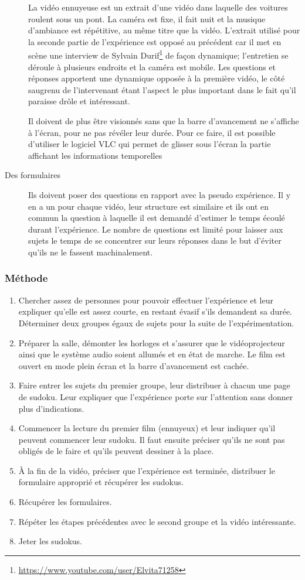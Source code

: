 \documentclass[12pt,fleqn,oneside,french,openany]{book} %
\begin{document}
\begin{description}
	La vidéo ennuyeuse est un extrait d'une vidéo dans laquelle des voitures roulent sous un pont. La caméra est fixe, il fait nuit et la musique d'ambiance est répétitive, au même titre que la vidéo. L'extrait utilisé pour la seconde partie de l'expérience est opposé au précédent car il met en scène une interview de Sylvain Durif\footnote{\url{https://www.youtube.com/user/Elvita71258}} de façon dynamique; l'entretien se déroule à plusieurs endroits et la caméra est mobile. Les questions et réponses apportent une dynamique opposée à la première vidéo, le côté saugrenu de l'intervenant étant l'aspect le plus important dans le fait qu'il paraisse drôle et intéressant. 

	Il doivent de plus être visionnés sans que la barre d'avancement ne s'affiche à l'écran, pour ne pas révéler leur durée. Pour ce faire, il est possible d'utiliser le logiciel VLC qui permet de glisser sous l'écran la partie affichant les informations temporelles  \item[Des formulaires] Ils doivent poser des questions en rapport avec la pseudo expérience. Il y en a un pour chaque vidéo, leur structure est similaire et ils ont en commun la question à laquelle il est demandé d'estimer le temps écoulé durant l'expérience. Le nombre de questions est limité pour laisser aux sujets le temps de se concentrer sur leurs réponses dans le but d'éviter qu'ils ne le fassent machinalement.
\end{description}

\subsubsection{Méthode} \label{sssec:methode1}
\begin{enumerate}
	\item Chercher assez de personnes pour pouvoir effectuer l'expérience et leur expliquer qu'elle est assez courte, en restant évasif s'ils demandent sa durée. Déterminer deux groupes égaux de sujets pour la suite de l'expérimentation.
	\item Préparer la salle, démonter les horloges et s'assurer que le vidéoprojecteur ainsi que le système audio soient allumés et en état de marche. Le film est ouvert en mode plein écran et la barre d'avancement est cachée.
	\item Faire entrer les sujets du premier groupe, leur distribuer à chacun une page de sudoku. Leur expliquer que l'expérience porte sur l'attention sans donner plus d'indications. 
	\item Commencer la lecture du premier film (ennuyeux) et leur indiquer qu'il peuvent commencer leur sudoku. Il faut ensuite préciser qu'ils ne sont pas obligés de le faire et qu'ils peuvent dessiner à la place. 
	\item À la fin de la vidéo, préciser que l'expérience est terminée, distribuer le formulaire approprié et récupérer les sudokus.
	\item Récupérer les formulaires.
	\item Répéter les étapes précédentes avec le second groupe et la vidéo intéressante.
	\item Jeter les sudokus.
\end{enumerate}
\end{document}
